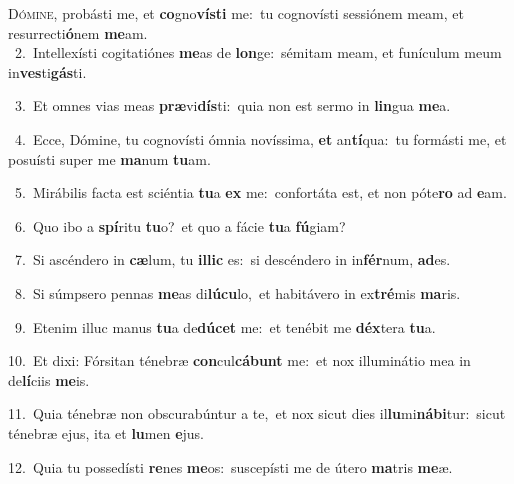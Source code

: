 \lettrine{\initial\textcolor{\initialcolor}{D}}{ómine,} probásti me, et \textbf{co}\-gno\-\textbf{vís}\-\textbf{ti} me:~\star tu cognovísti sessiónem meam, et resurrecti\-\textbf{ó}\-nem \textbf{me}\-am.\\
{\numbfont\textcolor{\numbcolor}{~2.}}~Intellexísti cogitatiónes \textbf{me}\-as de \textbf{lon}\-ge:~\star sémitam meam, et funículum meum in\-\textbf{ves}\-ti\-\textbf{gás}\-ti.\par
{\numbfont\textcolor{\numbcolor}{~3.}}~Et omnes vias meas \textbf{præ}\-vi\-\textbf{dís}\-ti:~\star quia non est sermo in \textbf{lin}\-gua \textbf{me}\-a.\par
{\numbfont\textcolor{\numbcolor}{~4.}}~Ecce, Dómine, tu cognovísti ómnia novíssima, \textbf{et} an\-\textbf{tí}\-qua:~\star tu formásti me, et posuísti super me \textbf{ma}\-num \textbf{tu}\-am.\par
{\numbfont\textcolor{\numbcolor}{~5.}}~Mirábilis facta est sciéntia \textbf{tu}\-a \textbf{ex} me:~\star confortáta est, et non póte\textbf{ro} ad \textbf{e}\-am.\par
{\numbfont\textcolor{\numbcolor}{~6.}}~Quo ibo a \textbf{spí}\-ritu \textbf{tu}\-o?~\star et quo a fácie \textbf{tu}\-a \textbf{fú}\-giam?\par
{\numbfont\textcolor{\numbcolor}{~7.}}~Si ascéndero in \textbf{cæ}\-lum, tu \textbf{il}\-\textbf{lic} es:~\star si descéndero in in\-\textbf{fér}\-num, \textbf{ad}\-es.\par
{\numbfont\textcolor{\numbcolor}{~8.}}~Si súmpsero pennas \textbf{me}\-as di\-\textbf{lú}\-\textbf{cu}lo,~\star et habitávero in ex\-\textbf{tré}\-mis \textbf{ma}\-ris.\par
{\numbfont\textcolor{\numbcolor}{~9.}}~Etenim illuc manus \textbf{tu}\-a de\-\textbf{dú}\-\textbf{cet} me:~\star et tenébit me \textbf{déx}\-tera \textbf{tu}\-a.\par
{\numbfont\textcolor{\numbcolor}{10.}}~Et dixi: Fórsitan ténebræ \textbf{con}\-cul\-\textbf{cá}\-\textbf{bunt} me:~\star et nox illuminátio mea in de\-\textbf{lí}\-ciis \textbf{me}\-is.\par
{\numbfont\textcolor{\numbcolor}{11.}}~Quia ténebræ non obscurabúntur a te,~\dagger et nox sicut dies il\-\textbf{lu}\-mi\-\textbf{ná}\-\textbf{bi}tur:~\star sicut ténebræ ejus, ita et \textbf{lu}\-men \textbf{e}\-jus.\par
{\numbfont\textcolor{\numbcolor}{12.}}~Quia tu possedísti \textbf{re}\-nes \textbf{me}\-os:~\star suscepísti me de útero \textbf{ma}\-tris \textbf{me}\-æ.\par
